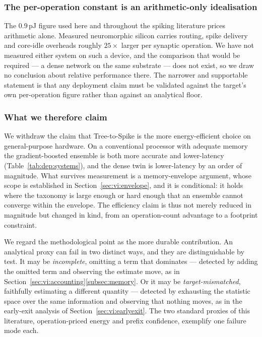 \subsubsection{The per-operation constant is an arithmetic-only idealisation}
The $0.9$\,pJ figure used here and throughout the spiking literature prices
arithmetic alone. Measured neuromorphic silicon carries routing, spike delivery
and core-idle overheads roughly $25\times$ larger per synaptic operation. We have
not measured either system on such a device, and the comparison that would be
required --- a dense network on the same substrate --- does not exist, so we draw
no conclusion about relative performance there. The narrower and supportable
statement is that any deployment claim must be validated against the target's own
per-operation figure rather than against an analytical floor.

\subsubsection{What we therefore claim}
We withdraw the claim that Tree-to-Spike is the more energy-efficient choice on
general-purpose hardware. On a conventional processor with adequate memory the
gradient-boosted ensemble is both more accurate and lower-latency
(Table~\ref{tab:dep:systems}), and the dense twin is lower-latency by an order of
magnitude. What survives measurement is a memory-envelope argument, whose scope
is established in Section~\ref{sec:vi:envelope}, and it is conditional: it holds
where the taxonomy is large enough or hard enough that an ensemble cannot
converge within the envelope. The efficiency claim is thus not merely reduced in
magnitude but changed in kind, from an operation-count advantage to a footprint
constraint.

We regard the methodological point as the more durable contribution. An
analytical proxy can fail in two distinct ways, and they are distinguishable by
test. It may be \emph{incomplete}, omitting a term that dominates --- detected by
adding the omitted term and observing the estimate move, as in
Section~\ref{sec:vi:accounting}\ref{subsec:memory}. Or it may be
\emph{target-mismatched}, faithfully estimating a different quantity --- detected
by exhausting the statistic space over the same information and observing that
nothing moves, as in the early-exit analysis of
Section~\ref{sec:vi:earlyexit}. The two standard proxies of this literature,
operation-priced energy and prefix confidence, exemplify one failure mode each.
